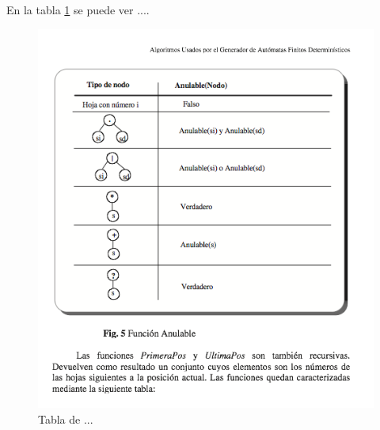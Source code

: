 \documentclass{book}
\begin{document}
En la tabla \ref{fig:tabla1} se puede ver ....
\begin{figure}
\centering
\includegraphics[width=12cm]{img/tabla1.png}
\caption{Tabla de ...}
\label{fig:tabla1}
\end{figure}
\end{document}
